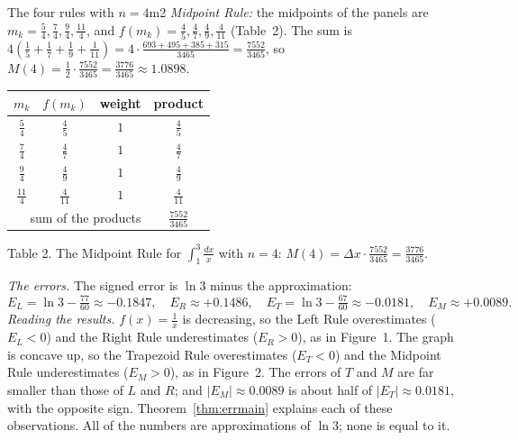 \documentclass[11pt]{article}
\begin{document}
\begin{exmp}{The four rules with $n=4$}{m2}
\emph{Midpoint Rule:} the midpoints of the panels are $m_k=\frac54,\frac74,\frac94,\frac{11}4$, and $f(m_k)=\frac45,\frac47,\frac49,\frac4{11}$ (Table~2). The sum is $4\left(\frac15+\frac17+\frac19+\frac1{11}\right)=4\cdot\frac{693+495+385+315}{3465}=\frac{7552}{3465}$, so $M(4)=\frac12\cdot\frac{7552}{3465}=\frac{3776}{3465}\approx1.0898$.
\begin{center}
\begin{tabular}{cccc}
\toprule $m_k$ & $f(m_k)$ & weight & product\\\midrule
$\frac54$ & $\frac45$ & $1$ & $\frac45$\\
$\frac74$ & $\frac47$ & $1$ & $\frac47$\\
$\frac94$ & $\frac49$ & $1$ & $\frac49$\\
$\frac{11}4$ & $\frac4{11}$ & $1$ & $\frac4{11}$\\\midrule
\multicolumn{3}{r}{sum of the products} & $\frac{7552}{3465}$\\\bottomrule
\end{tabular}
\end{center}
\begin{center}\small Table 2. The Midpoint Rule for $\int_1^3\frac{dx}x$ with $n=4$: $M(4)=\Delta x\cdot\frac{7552}{3465}=\frac{3776}{3465}$.\end{center}
\emph{The errors.} The signed error is $\ln3$ minus the approximation:
\[E_L=\ln3-\tfrac{77}{60}\approx-0.1847,\quad E_R\approx+0.1486,\quad E_T=\ln3-\tfrac{67}{60}\approx-0.0181,\quad E_M\approx+0.0089.\]
\emph{Reading the results.} $f(x)=\frac1x$ is decreasing, so the Left Rule overestimates ($E_L<0$) and the Right Rule underestimates ($E_R>0$), as in Figure~1. The graph is concave up, so the Trapezoid Rule overestimates ($E_T<0$) and the Midpoint Rule underestimates ($E_M>0$), as in Figure~2. The errors of $T$ and $M$ are far smaller than those of $L$ and $R$; and $\lvert E_M\rvert\approx0.0089$ is about half of $\lvert E_T\rvert\approx0.0181$, with the opposite sign. Theorem~\ref{thm:errmain} explains each of these observations. All of the numbers are approximations of $\ln3$; none is equal to it.
\end{exmp}
\end{document}
